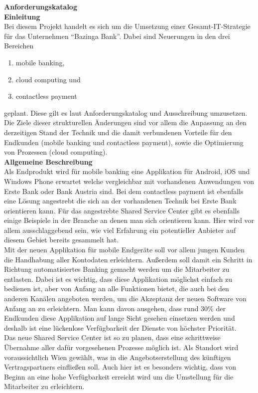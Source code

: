 \textbf{Anforderungskatalog}\\

\textbf{Einleitung}\\
Bei diesem Projekt handelt es sich um die Umsetzung einer Gesamt-IT-Strategie f\"ur das Unternehmen ``Bazinga Bank''. Dabei sind Neuerungen in den drei Bereichen
\begin{enumerate}
\item mobile banking,
\item cloud computing und
\item contactless payment
\end{enumerate}
geplant. Diese gilt es laut Anforderungskatalog und Ausschreibung umzusetzen. 
Die Ziele dieser strukturellen Änderungen sind vor allem die Anpassung an den derzeitigen Stand der Technik und die damit verbundenen Vorteile für den Endkunden (mobile banking und contactless payment), sowie die Optimierung von Prozessen (cloud computing).\\

\textbf{Allgemeine Beschreibung}\\
Als Endprodukt wird f\"ur mobile banking eine Applikation f\"ur Android, iOS und Windows Phone erwartet welche vergleichbar mit vorhandenen Anwendungen von Erste Bank oder Bank Austria sind. Bei dem contactless payment ist ebenfalls eine L\"osung angestrebt die sich an der vorhandenen Technik bei Erste Bank orientieren kann. F\"ur das angestrebte Shared Service Center gibt es ebenfalls einige Beispiele in der Branche an denen man sich orientieren kann. Hier wird vor allem ausschlaggebend sein, wie viel Erfahrung ein potentieller Anbieter auf diesem Gebiet bereits gesammelt hat.\\

Mit der neuen Applikation f\"ur mobile Endger\"ate soll vor allem jungen Kunden die Handhabung aller Kontodaten erleichtern. Außerdem soll damit ein Schritt in Richtung automatisiertes Banking gemacht werden um die Mitarbeiter zu entlasten. Dabei ist es wichtig, dass diese Applikation m\"oglichst einfach zu bedienen ist, aber von Anfang an alle Funktionen bietet, die auch bei den anderen Kan\"alen angeboten werden, um die Akzeptanz der neuen Software von Anfang an zu erleichtern. Man kann davon ausgehen, dass rund 30\% der Endkunden diese Applikation auf lange Sicht gesehen einsetzen werden und deshalb ist eine l\"uckenlose Verfügbarkeit der Dienste von h\"ochster Priorit\"at.\\

Das neue Shared Service Center ist so zu planen, dass eine schrittweise \"Ubernahme aller daf\"ur vorgesehenen Prozesse m\"oglich ist. Als Standort wird voraussichtlich Wien gew\"ahlt, was in die Angebotserstellung des k\"unftigen Vertragspartners einflie\ss en soll. Auch hier ist es besonders wichtig, dass von Beginn an eine hohe Verf\"ugbarkeit erreicht wird um die Umstellung f\"ur die Mitarbeiter zu erleichtern.\\

